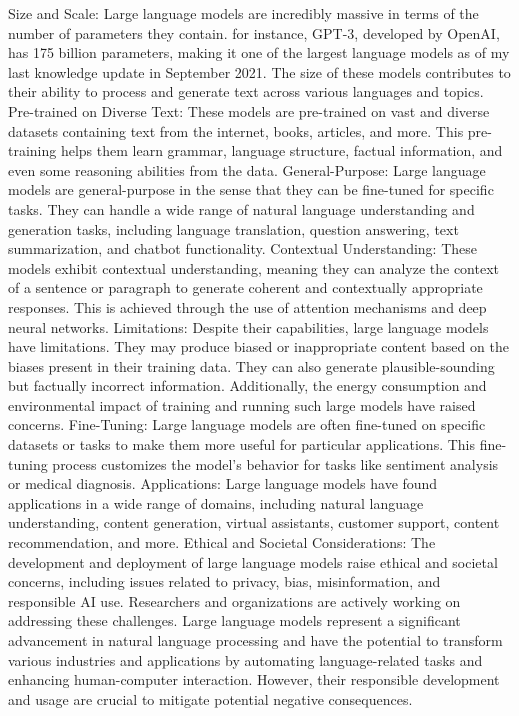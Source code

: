 Size and Scale: Large language models are incredibly massive in terms of the number of parameters they contain. for instance, GPT-3, developed by OpenAI, has 175 billion parameters, making it one of the largest language models as of my last knowledge update in September 2021. The size of these models contributes to their ability to process and generate text across various languages and topics.
Pre-trained on Diverse Text: These models are pre-trained on vast and diverse datasets containing text from the internet, books, articles, and more. This pre-training helps them learn grammar, language structure, factual information, and even some reasoning abilities from the data.
General-Purpose: Large language models are general-purpose in the sense that they can be fine-tuned for specific tasks. They can handle a wide range of natural language understanding and generation tasks, including language translation, question answering, text summarization, and chatbot functionality.
Contextual Understanding: These models exhibit contextual understanding, meaning they can analyze the context of a sentence or paragraph to generate coherent and contextually appropriate responses. This is achieved through the use of attention mechanisms and deep neural networks.
Limitations: Despite their capabilities, large language models have limitations. They may produce biased or inappropriate content based on the biases present in their training data. They can also generate plausible-sounding but factually incorrect information. Additionally, the energy consumption and environmental impact of training and running such large models have raised concerns.
Fine-Tuning: Large language models are often fine-tuned on specific datasets or tasks to make them more useful for particular applications. This fine-tuning process customizes the model's behavior for tasks like sentiment analysis or medical diagnosis.
Applications: Large language models have found applications in a wide range of domains, including natural language understanding, content generation, virtual assistants, customer support, content recommendation, and more.
Ethical and Societal Considerations: The development and deployment of large language models raise ethical and societal concerns, including issues related to privacy, bias, misinformation, and responsible AI use. Researchers and organizations are actively working on addressing these challenges.
Large language models represent a significant advancement in natural language processing and have the potential to transform various industries and applications by automating language-related tasks and enhancing human-computer interaction. However, their responsible development and usage are crucial to mitigate potential negative consequences.
